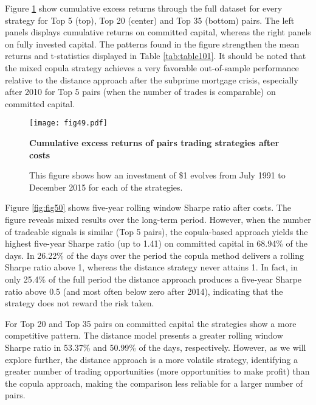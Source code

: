 \documentclass[a4paper]{article}
\begin{document}
\vspace{0.6cm}


Figure \ref{fig:fig49} show cumulative excess returns through the full dataset for every strategy for Top 5 (top), Top 20 (center) and Top 35 (bottom) pairs. The left panels displays cumulative returns on committed capital, whereas the right panels on fully invested capital. The patterns found in the figure strengthen the mean returns and t-statistics displayed in Table \ref{tab:table101}. It should be noted that the mixed copula strategy achieves a very favorable out-of-sample performance relative to the distance approach after the subprime mortgage crisis, especially after 2010 for Top 5 pairs (when the number of trades is comparable) on committed capital. 

\begin{figure}[H]
	\centering
	\texttt{[image: fig49.pdf]}
	\caption{\textbf{Cumulative excess returns of pairs trading strategies after costs}}
	\caption*{\scriptsize This figure shows how an investment of \$1 evolves from July 1991 to December 2015 for each of the strategies.}
	\label{fig:fig49}
\end{figure}

Figure \ref{fig:fig50} shows five-year rolling window Sharpe ratio after costs. The figure reveals mixed results over the long-term period. However, when the number of tradeable signals is similar (Top 5 pairs), the copula-based approach yields the highest five-year Sharpe ratio (up to 1.41) on committed capital in 68.94\% of the days. In 26.22\% of the days over the period the copula method delivers a rolling Sharpe ratio above 1, whereas the distance strategy never attains 1. In fact, in only 25.4\% of the full period the distance approach produces a five-year Sharpe ratio above 0.5 (and most often below zero after 2014), indicating that the strategy does not reward the risk taken.

For Top 20 and Top 35 pairs on committed capital the strategies show a more competitive pattern. The distance model presents a greater rolling window Sharpe ratio in 53.37\% and 50.99\% of the days, respectively. However, as we will explore further, the distance approach is a more volatile strategy, identifying a greater number of trading opportunities (more opportunities to make profit) than the copula approach, making the comparison less reliable for a larger number of pairs.
\end{document}
